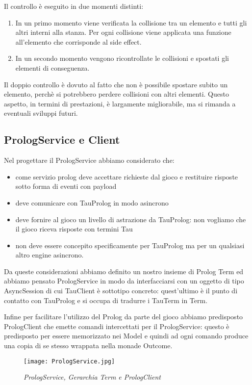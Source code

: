 Il controllo è eseguito in due momenti distinti: 
\begin{enumerate}
  \item In un primo momento viene verificata la collisione tra un elemento e tutti gli altri interni alla stanza. Per ogni collisione viene applicata una funzione all'elemento che corrisponde al side effect.
  \item In un secondo momento vengono ricontrollate le collisioni e spostati gli elementi di conseguenza. 
\end{enumerate}

Il doppio controllo è dovuto al fatto che non è possibile spostare subito un elemento, perchè si potrebbero perdere collisioni con altri elementi.
Questo aspetto, in termini di prestazioni, è largamente migliorabile, ma si rimanda a eventuali sviluppi futuri.

\subsection{PrologService e Client}
Nel progettare il PrologService abbiamo considerato che:
\begin{itemize}
    \item come servizio prolog deve accettare richieste dal gioco e restituire risposte sotto forma di eventi con payload
    \item deve comunicare con TauProlog in modo asincrono
    \item deve fornire al gioco un livello di astrazione da TauProlog: non vogliamo che il gioco riceva risposte con termini Tau
    \item non deve essere concepito specificamente per TauProlog ma per un qualsiasi altro engine asincrono.
\end{itemize}   

Da queste considerazioni abbiamo definito un nostro insieme di Prolog Term ed abbiamo pensato PrologService in modo da interfacciarsi con un oggetto di tipo AsyncSession di cui TauClient è sottotipo concreto: quest'ultimo è il punto di contatto con TauProlog e si occupa di tradurre i TauTerm in Term.

Infine per facilitare l'utilizzo del Prolog da parte del gioco abbiamo predisposto PrologClient che emette comandi intercettati per il PrologService: questo è predisposto per essere memorizzato nei Model e quindi ad ogni comando produce una copia di se stesso wrappata nella monade Outcome.

\begin{figure}[!hbt]
    \centering
    \texttt{[image: PrologService.jpg]}
    \caption{\textit{PrologService, Gerarchia Term e PrologClient}} 
\end{figure}

